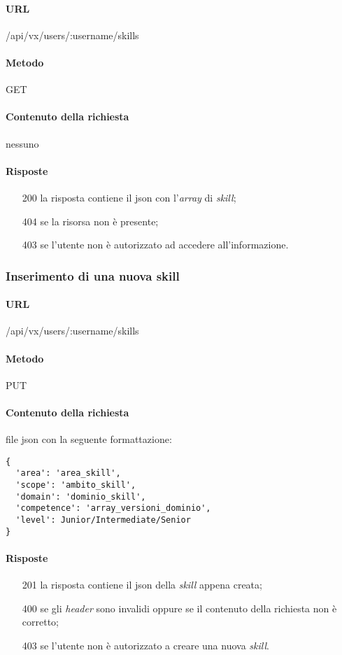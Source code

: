 \paragraph{URL}
/api/vx/users/:username/skills
\paragraph{Metodo}
GET
\paragraph{Contenuto della richiesta}
nessuno
\paragraph{Risposte}
\begin{itemize}
	\item[200] la risposta contiene il \gls{json} con l'\emph{array} di \emph{skill};
	\item[404] se la risorsa non è presente;
	\item[403] se l'utente non è autorizzato ad accedere all'informazione.
\end{itemize}


\subsubsection{Inserimento di una nuova skill}
\paragraph{URL}
/api/vx/users/:username/skills
\paragraph{Metodo}
PUT
\paragraph{Contenuto della richiesta}
file \gls{json} con la seguente formattazione:
\begin{verbatim}
{
  'area': 'area_skill',
  'scope': 'ambito_skill',
  'domain': 'dominio_skill',
  'competence': 'array_versioni_dominio',
  'level': Junior/Intermediate/Senior
}
\end{verbatim}
\paragraph{Risposte}
\begin{itemize}
	\item[201] la risposta contiene il \gls{json} della \emph{skill} appena creata;
	\item[400] se gli \emph{header} sono invalidi oppure se il contenuto della richiesta non è corretto;
	\item[403] se l'utente non è autorizzato a creare una nuova \emph{skill}.
\end{itemize}

